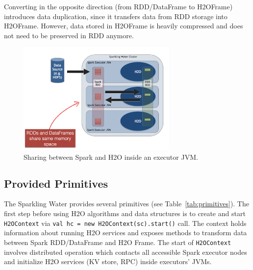 Converting in the opposite direction (from RDD/DataFrame to H2OFrame) introduces data duplication, since it transfers data from RDD storage into H2OFrame. However, data stored in H2OFrame is heavily compressed and does not need to be preserved in RDD anymore.
\begin{figure}[h]
	\centering
	\includegraphics[width=0.7\textwidth]{sw/images/DataShare.png}
	\caption{Sharing between Spark and H2O inside an executor JVM.}
\end{figure}


\subsection{Provided Primitives}

The Sparkling Water provides several primitives (see Table~\ref{tab:primitives}). The first step before using H2O algorithms and data structures is to create and start \texttt{H2OContext} via \texttt{val hc = new H2OContext(sc).start()} call. The context holds information about running H2O services and exposes methods to transform data between Spark RDD/DataFrame and H2O Frame. The start of \texttt{H2OContext} involves distributed operation which contacts all accessible Spark executor nodes and initialize H2O services (KV store, RPC) inside executors' JVMs.


